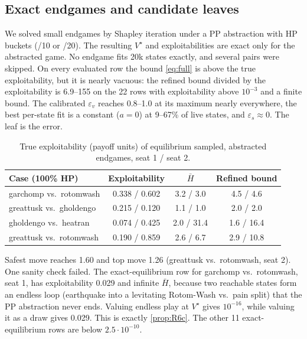 \documentclass[10pt]{article}
\theoremstyle{plain}
\theoremstyle{definition}
\theoremstyle{remark}
\newcommand{\Hbar}{\bar H}
\newcommand{\epss}{\varepsilon_s}
\newcommand{\epsv}{\varepsilon_v}
\newcommand{\Vstar}{V^\star}
\begin{document}
\subsection{Exact endgames and candidate leaves}
\label{sec:exp-end}
We solved small endgames by Shapley iteration under a PP abstraction with HP buckets (/10 or /20). The resulting $\Vstar$ and exploitabilities are exact only for the abstracted game. No endgame fits 20k states exactly, and several pairs were skipped. On every evaluated row the bound \eqref{eq:full} is above the true exploitability, but it is nearly vacuous: the refined bound divided by the exploitability is 6.9--155 on the 22 rows with exploitability above $10^{-3}$ and a finite bound. The calibrated $\epsv$ reaches 0.8--1.0 at its maximum nearly everywhere, the best per-state fit is a constant ($a=0$) at 9--67\% of live states, and $\epss\approx0$. The leaf is the error.
\begin{table}[h]
\centering\small
\caption{True exploitability (payoff units) of equilibrium sampled, abstracted endgames, seat 1 / seat 2.}
\label{tab:endgame}
\begin{tabular}{@{}lccc@{}}
\toprule
Case (100\% HP) & Exploitability & $\Hbar$ & Refined bound \\
\midrule
garchomp vs.\ rotomwash & 0.338 / 0.602 & 3.2 / 3.0 & 4.5 / 4.6 \\
greattusk vs.\ gholdengo & 0.215 / 0.120 & 1.1 / 1.0 & 2.0 / 2.0 \\
gholdengo vs.\ heatran & 0.074 / 0.425 & 2.0 / 31.4 & 1.6 / 16.4 \\
greattusk vs.\ rotomwash & 0.190 / 0.859 & 2.6 / 6.7 & 2.9 / 10.8 \\
\bottomrule
\end{tabular}
\vspace{-0.6em}
\end{table}
Safest move reaches 1.60 and top move 1.26 (greattusk vs.\ rotomwash, seat 2). One sanity check failed. The exact-equilibrium row for garchomp vs.\ rotomwash, seat 1, has exploitability 0.029 and infinite $\Hbar$, because two reachable states form an endless loop (earthquake into a levitating Rotom-Wash vs.\ pain split) that the PP abstraction never ends. Valuing endless play at $\Vstar$ gives $10^{-16}$, while valuing it as a draw gives 0.029. This is exactly \cref{prop:R6c}. The other 11 exact-equilibrium rows are below $2.5\cdot10^{-10}$.
\end{document}
